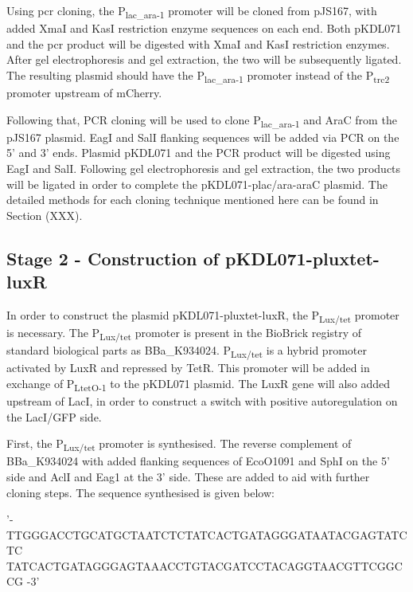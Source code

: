 Using \acrshort{pcr} cloning, the P\textsubscript{lac\_ara-1} promoter will be cloned from pJS167, with added XmaI and KasI  restriction enzyme sequences on each end. Both pKDL071 and the \acrshort{pcr} product will be digested with XmaI and KasI restriction enzymes. After gel electrophoresis and gel extraction, the two will be subsequently ligated. The resulting plasmid should have the P\textsubscript{lac\_ara-1} promoter instead of the P\textsubscript{trc2} promoter upstream of mCherry.


Following that, PCR cloning will be used to clone  P\textsubscript{lac\_ara-1} and AraC from the pJS167 plasmid. EagI and SalI flanking sequences will be added via PCR on the 5' and 3' ends. Plasmid pKDL071 and the PCR product will be digested using EagI and SalI. Following gel electrophoresis and gel extraction, the two products will be ligated in order to complete the pKDL071-plac/ara-araC plasmid. The detailed methods for each cloning technique mentioned here can be found in Section (XXX).


\subsection{Stage 2 - Construction of pKDL071-pluxtet-luxR}
\label{sec:stage2}


In order to construct the plasmid pKDL071-pluxtet-luxR, the P\textsubscript{Lux/tet} promoter is necessary. The P\textsubscript{Lux/tet} promoter is present in the BioBrick registry of standard biological parts as BBa\_K934024. P\textsubscript{Lux/tet} is a hybrid promoter activated by LuxR and repressed by TetR. This promoter will be added in exchange of P\textsubscript{LtetO-1} to the pKDL071 plasmid. The LuxR gene will also added upstream of LacI, in order to construct a switch with positive autoregulation on the LacI/GFP side. 

First, the P\textsubscript{Lux/tet} promoter is synthesised. The reverse complement of BBa\_K934024 with added flanking sequences of EcoO1091 and SphI on the 5' side and AclI and Eag1 at the 3' side. These are added to aid with further cloning steps. The sequence synthesised is given below:

\vspace{3 mm}
'- TTGGGACCTGCATGCTAATCTCTATCACTGATAGGGATAATACGAGTATCTC\\TATCACTGATAGGGAGTAAACCTGTACGATCCTACAGGTAACGTTCGGCCG -3'
\vspace{3 mm}

